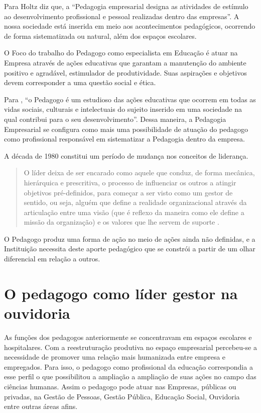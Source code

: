 \begin{refsection}
    Para Holtz \cite[1999 apud][p.~7]{OLIVEIRA2012Pedagogia} diz que, a “Pedagogia empresarial designa as atividades de estímulo ao desenvolvimento profissional e pessoal realizadas dentro das empresas”. A nossa sociedade está inserida em meio aos acontecimentos pedagógicos, ocorrendo de forma sistematizada ou natural, além dos espaços escolares.

    O Foco do trabalho do Pedagogo como especialista em Educação é atuar na Empresa através de ações educativas que garantam a manutenção do ambiente positivo e agradável, estimulador de produtividade. Suas aspirações e objetivos devem corresponder a uma questão social e ética.  

    Para \textcite[p.~20]{CADINHA2007Conceituando}, “o Pedagogo é um estudioso das ações educativas que ocorrem em todas as vidas sociais, culturais e intelectuais do sujeito inserido em uma sociedade na qual contribui para o seu desenvolvimento”. Dessa maneira, a Pedagogia Empresarial se configura como mais uma possibilidade de atuação do pedagogo como profissional responsável em sistematizar a Pedagogia dentro da empresa. 

    A década de 1980 constitui um período de mudança nos conceitos de liderança.  

    \begin{quotation}
        O líder deixa de ser encarado como aquele que conduz, de forma mecânica, hierárquica e prescritiva, o processo de influenciar os outros a atingir objetivos pré-definidos, para começar a ser visto como um gestor de sentido, ou seja, alguém que define a realidade organizacional através da articulação entre uma visão (que é reflexo da maneira como ele define a missão da organização) e os valores que lhe servem de suporte \cite[BRYMAN, 1996, p.~280 apud][p.~21]{COSTAAndCASTANHEIRA2015liderança}.  
    \end{quotation}

    O Pedagogo produz uma forma de ação no meio de ações ainda não definidas, e a Instituição necessita deste aporte pedagógico que se constrói a partir de um olhar diferencial em relação a outros.  


    \section{O pedagogo como líder gestor na ouvidoria}

    As funções dos pedagogos anteriormente se concentravam em espaços escolares e hospitalares. Com a reestruturação produtiva no espaço empresarial percebeu-se a necessidade de promover uma relação mais humanizada entre empresa e empregados. Para isso, o pedagogo como profissional da educação correspondia a esse perfil o que possibilitou a ampliação a ampliação de suas ações no campo das ciências humanas. Assim o pedagogo pode atuar nas Empresas, públicas ou privadas, na Gestão de Pessoas, Gestão Pública, Educação Social, Ouvidoria entre outras áreas afins.  


\end{refsection}
